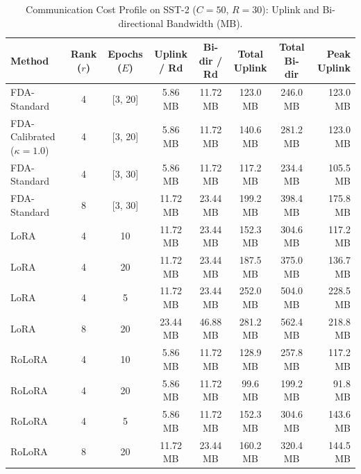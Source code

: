 \documentclass[10pt,a4paper]{article}
\begin{document}
\begin{table}[H]
\centering
\caption{Communication Cost Profile on SST-2 ($C=50$, $R=30$): Uplink and Bi-directional Bandwidth (MB).}
\scriptsize
\setlength{\tabcolsep}{4.0pt}
\begin{tabular*}{\textwidth}{@{\extracolsep{\fill}}lccccccr@{}}
\toprule
\textbf{Method} & \textbf{Rank ($r$)} & \textbf{Epochs ($E$)} & \textbf{Uplink / Rd} & \textbf{Bi-dir / Rd} & \textbf{Total Uplink} & \textbf{Total Bi-dir} & \textbf{Peak Uplink} \\
\midrule
FDA-Standard & 4 & [3, 20] & 5.86 MB & 11.72 MB & 123.0 MB & 246.0 MB & 123.0 MB \\
FDA-Calibrated ($\kappa=1.0$) & 4 & [3, 20] & 5.86 MB & 11.72 MB & 140.6 MB & 281.2 MB & 123.0 MB \\
FDA-Standard & 4 & [3, 30] & 5.86 MB & 11.72 MB & 117.2 MB & 234.4 MB & 105.5 MB \\
FDA-Standard & 8 & [3, 30] & 11.72 MB & 23.44 MB & 199.2 MB & 398.4 MB & 175.8 MB \\
LoRA & 4 & 10 & 11.72 MB & 23.44 MB & 152.3 MB & 304.6 MB & 117.2 MB \\
LoRA & 4 & 20 & 11.72 MB & 23.44 MB & 187.5 MB & 375.0 MB & 136.7 MB \\
LoRA & 4 & 5 & 11.72 MB & 23.44 MB & 252.0 MB & 504.0 MB & 228.5 MB \\
LoRA & 8 & 20 & 23.44 MB & 46.88 MB & 281.2 MB & 562.4 MB & 218.8 MB \\
RoLoRA & 4 & 10 & 5.86 MB & 11.72 MB & 128.9 MB & 257.8 MB & 117.2 MB \\
RoLoRA & 4 & 20 & 5.86 MB & 11.72 MB & 99.6 MB & 199.2 MB & 91.8 MB \\
RoLoRA & 4 & 5 & 5.86 MB & 11.72 MB & 152.3 MB & 304.6 MB & 143.6 MB \\
RoLoRA & 8 & 20 & 11.72 MB & 23.44 MB & 160.2 MB & 320.4 MB & 144.5 MB \\
\bottomrule
\end{tabular*}
\end{table}
\end{document}
